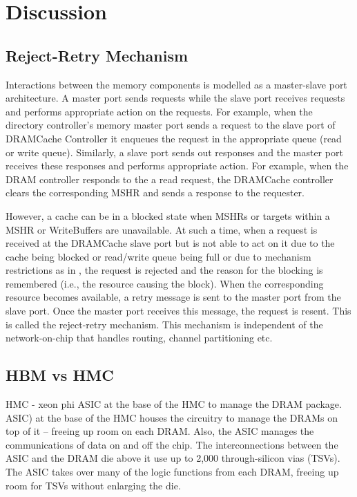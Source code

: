 \section{Discussion}
\subsection{Reject-Retry Mechanism}

Interactions between the memory components is modelled as a master-slave port architecture. A master port sends requests while the slave port receives requests and performs appropriate action on the requests. For example, when the directory controller's memory master port sends a request to the slave port of DRAMCache Controller it enqueues the request in the appropriate queue (read or write queue). Similarly, a slave port sends out responses and the master port receives these responses and performs appropriate action. For example, when the DRAM controller responds to the a read request, the DRAMCache controller clears the corresponding MSHR and sends a response to the requester.
\par However, a cache can be in a blocked state when MSHRs or targets within a MSHR or WriteBuffers are unavailable. At such a time, when a request is received at the DRAMCache slave port but is not able to act on it due to the cache being blocked or read/write queue being full or due to mechanism restrictions as in \prioname, the request is rejected and the reason for the blocking is remembered (i.e., the resource causing the block). When the corresponding resource becomes available, a retry message is sent to the master port from the slave port. Once the master port receives this message, the request is resent. This is called the reject-retry mechanism. This mechanism is independent of the network-on-chip that handles routing, channel partitioning etc.
\subsection{HBM vs HMC}
HMC - xeon phi 
ASIC at the base of the HMC to manage the DRAM package.
ASIC) at the base of the HMC houses the circuitry to manage the DRAMs on top of it -- freeing up room on each DRAM. Also, the ASIC manages the communications of data on and off the chip. The interconnections between the ASIC and the DRAM die above it use up to 2,000 through-silicon vias (TSVs). The ASIC takes over many of the logic functions from each DRAM, freeing up room for TSVs without enlarging the die.

